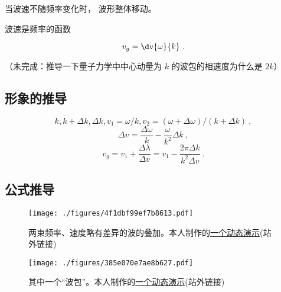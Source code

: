 
\begin{issues}
\issueDraft
\end{issues}


当波速不随频率变化时， 波形整体移动。

波速是频率的函数

\begin{equation}
v_g = \dv{\omega}{k}~.
\end{equation}

（未完成：推导一下量子力学中中心动量为 $k$ 的波包的相速度为什么是 $2k$）

\subsection{形象的推导}
\begin{equation}
k, k+\Delta k, \Delta k, v_1 = \omega/k, v_2 = (\omega+\Delta\omega)/(k+\Delta k)~,
\end{equation}
\begin{equation}
\Delta v = \frac{\Delta \omega}{k} - \frac{\omega}{k^2}\Delta k~,
\end{equation}
\begin{equation}
v_g = v_1 + \frac{\Delta \lambda}{\Delta v} = v_1 - \frac{2\pi\Delta k}{k^2\Delta v}~.
\end{equation}

\subsection{公式推导}
\begin{figure}[ht]
\centering
\texttt{[image: ./figures/4f1dbf99ef7b8613.pdf]}
\caption{两束频率、速度略有差异的波的叠加。本人制作的\href{https://www.geogebra.org/m/vnjwxmqk}{一个动态演示}(站外链接)} \label{fig_GroupV_1}
\end{figure}

\begin{figure}[ht]
\centering
\texttt{[image: ./figures/385e070e7ae8b627.pdf]}
\caption{其中一个“波包”。本人制作的\href{https://www.geogebra.org/m/xb6uqd7x}{一个动态演示}(站外链接)} \label{fig_GroupV_2}
\end{figure}

